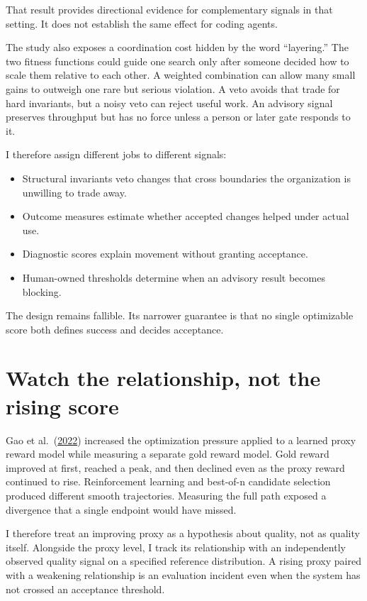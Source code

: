 That result provides directional evidence for complementary signals in that setting. It does not establish the same effect for coding agents.

The study also exposes a coordination cost hidden by the word ``layering.'' The two fitness functions could guide one search only after someone decided how to scale them relative to each other. A weighted combination can allow many small gains to outweigh one rare but serious violation. A veto avoids that trade for hard invariants, but a noisy veto can reject useful work. An advisory signal preserves throughput but has no force unless a person or later gate responds to it.

I therefore assign different jobs to different signals:

\begin{itemize}
\tightlist
\item
  Structural invariants veto changes that cross boundaries the organization is unwilling to trade away.
\item
  Outcome measures estimate whether accepted changes helped under actual use.
\item
  Diagnostic scores explain movement without granting acceptance.
\item
  Human-owned thresholds determine when an advisory result becomes blocking.
\end{itemize}

The design remains fallible. Its narrower guarantee is that no single optimizable score both defines success and decides acceptance.

\section{Watch the relationship, not the rising score}\label{watch-the-relationship-not-the-rising-score}

Gao et al.~(\href{https://arxiv.org/abs/2210.10760}{2022}) increased the optimization pressure applied to a learned proxy reward model while measuring a separate gold reward model. Gold reward improved at first, reached a peak, and then declined even as the proxy reward continued to rise. Reinforcement learning and best-of-n candidate selection produced different smooth trajectories. Measuring the full path exposed a divergence that a single endpoint would have missed.

I therefore treat an improving proxy as a hypothesis about quality, not as quality itself. Alongside the proxy level, I track its relationship with an independently observed quality signal on a specified reference distribution. A rising proxy paired with a weakening relationship is an evaluation incident even when the system has not crossed an acceptance threshold.

